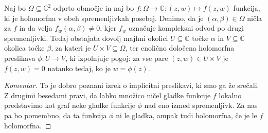 \documentclass[mat1]{fmfdelo}
\numberwithin{equation}{section}
\newcommand{\C}{\mathbb C}
\theoremstyle{definition}
\newenvironment{komentar}[1][Komentar]{\begin{proof}[#1]\let\qed\relax}{\end{proof}}
\begin{document}
\begin{izrek}
    \label{izrek o impliclitni preslikavi}
    Naj bo $\Omega \subseteq \C^2$ odprto območje in naj bo $f : \Omega \to \C : (z, w) \mapsto f(z,w)$ funkcija, ki je holomorfna v obeh spremenljivkah posebej. Denimo, da je $(\alpha, \beta) \in \Omega$ ničla za $f$ in da velja $f_w(\alpha, \beta) \neq 0$, kjer $f_w$ označuje kompleksni odvod po drugi spremenljivki. Tedaj obstajata dovolj majhni okolici $U \subseteq \C$ točke $\alpha$ in $V \subseteq \C$ okolica točke $\beta$, za kateri je $U \times V \subseteq \Omega$, ter enolično določena holomorfna preslikava $\phi : U \to V$, ki izpolnjuje pogoj: 
    za vse pare $(z, w) \in U \times V$ je $f(z,w) = 0$ natanko tedaj, ko je $w = \phi(z)$.

    
    

\end{izrek}

\begin{komentar}
    To je dobro poznani izrek o implicitni preslikavi, ki smo ga že srečali. Z drugimi besedami pravi, da lahko množico ničel gladke funkcije $f$ lokalno predstavimo kot graf neke gladke funkcije $\phi$ nad eno izmed spremenljivk. Za nas pa bo pomembno, da ta funkcija $\phi$ ni le gladka, ampak tudi holomorfna, če je le $f$ holomorfna. 
\end{komentar}
\end{document}
